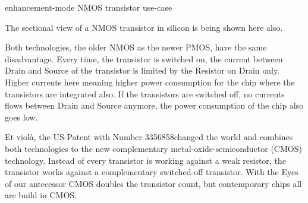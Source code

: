 \begin{center}
    enhancement-mode NMOS transistor use-case
    \begin{figure}[h] %
        \centering
        \begin{circuitdiagram}{20}{20}
        \end{circuitdiagram}
    \end{figure}
\end{center}

The sectional view of a NMOS transistor in silicon is being shown here also.

Both technologies, the older NMOS as the newer PMOS, have the same disadvantage. Every time, the transistor is switched on, the current between Drain and Source of the transistor is limited by the Resistor on Drain only. Higher currents here meaning higher power consumption for the chip where the transistors are integrated also. If the transistors are switched off, no currents flows between Drain and Source anymore, the power consumption of the chip also goes low.

Et violà, the US-Patent with Number 3356858\footnotemark changed the world and combines both technologies to the new complementary metal-oxide-semiconductor (CMOS) technology. Instead of every transistor is working against a weak resistor, the transistor works against a complementary switched-off transistor. With the Eyes of our antecessor CMOS doubles the transistor count, but contemporary chips all are build in CMOS.

